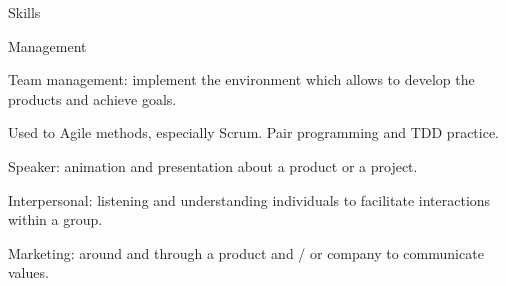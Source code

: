 \begin{rSection}{Skills}
  \begin{rSubsection}{Management}{}{}{}
    \item Team management: implement the environment which allows to develop the products and achieve goals.
    \item Used to Agile methods, especially Scrum. Pair programming and TDD practice.
    \item Speaker: animation and presentation about a product or a project.
    \item Interpersonal: listening and understanding individuals to facilitate interactions within a group.
    \item Marketing: around and through a product and / or company to communicate values.
  \end{rSubsection}

\end{rSection}
